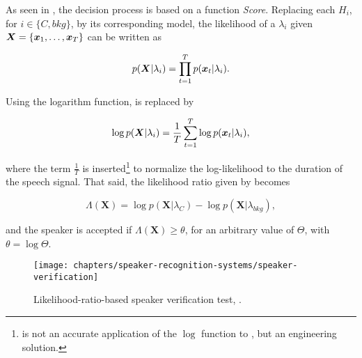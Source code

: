 As seen in , the decision process is based on a function \emph{Score}. Replacing each $H_i$, for $i \in \{C, bkg\}$, by its corresponding model, the likelihood of a $\lambda_i$ given $\boldsymbol{X} = \{\boldsymbol{x}_1, \dots, \boldsymbol{x}_T\}$ can be written as

\begin{equation}
    p(\boldsymbol{X}|\lambda_i) = \prod_{t=1}^T p(\dvec{x}_t|\lambda_i).
    \label{eq:likelihood-prod}
\end{equation}

\noindent Using the logarithm function,  is replaced by

\begin{equation}
    \log p(\boldsymbol{X}|\lambda_i) = \frac{1}{T} \sum_{t=1}^T \log p(\dvec{x}_t|\lambda_i),
    \label{eq:log-likelihood-sum}
\end{equation}

\noindent where the term $\frac{1}{T}$ is inserted\footnote{ is not an accurate application of the $\log$ function to , but an engineering solution.} to normalize the log-likelihood to the duration of the speech signal. That said, the likelihood ratio given by  becomes

\begin{equation}
    \Lambda(\boldsymbol{X}) = \log p(\boldsymbol{X}|\lambda_{C}) - \log p(\boldsymbol{X}|\lambda_{bkg}),
    \label{eq:score_of_X}
\end{equation}

\noindent and the speaker is accepted if $\Lambda(\boldsymbol{X}) \geq \theta$, for an arbitrary value of $\Theta$, with $\theta = \log\Theta$.

\begin{figure}[ht]
    \centering
    \texttt{[image: chapters/speaker-recognition-systems/speaker-verification]}
    \caption{Likelihood-ratio-based speaker verification test, .}
    \label{fig:speaker-verification}
\end{figure}